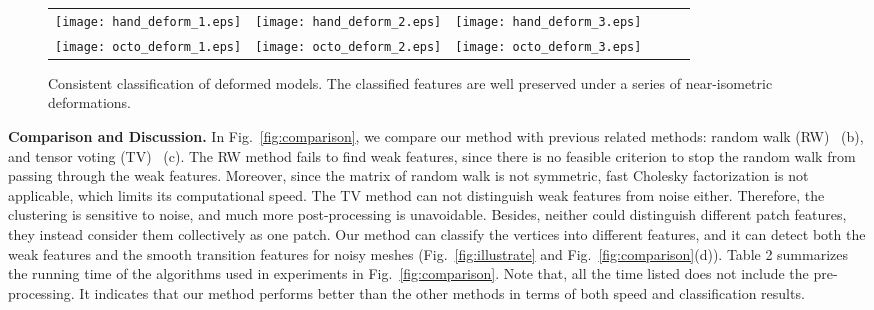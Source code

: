 \documentclass[10pt,journal,cspaper,compsoc]{IEEEtran}
\begin{document}
\begin{figure*}
\begin{center}
    \begin{tabular}{@{}c@{} @{}c@{} @{}c@{} @{}c@{} @{}c@{} @{}c@{}}
           \texttt{[image: hand\_deform\_1.eps]}&
           \texttt{[image: hand\_deform\_2.eps]}&
        \texttt{[image: hand\_deform\_3.eps]}\\
       \texttt{[image: octo\_deform\_1.eps]}&
        \texttt{[image: octo\_deform\_2.eps]}&
        \texttt{[image: octo\_deform\_3.eps]}\\
    \end{tabular}
    \caption{Consistent classification of deformed models.
The classified features are well preserved under a series of
near-isometric deformations.}
    \label{fig:Deformed}
\end{center}
\end{figure*}

\textbf{Comparison and Discussion.}
In Fig.~\ref{fig:comparison}, we compare our method with previous
related methods: random walk (RW)~\cite{LHMR09} (b), and tensor voting
(TV)~\cite{KCL09} (c). The RW method fails to find weak features,
since there is no feasible criterion to stop the random walk from
passing through the weak features. Moreover, since the matrix of
random walk is not symmetric, fast Cholesky factorization is not
applicable, which limits its computational speed. The TV method can
not distinguish weak features from noise either. Therefore, the
clustering is sensitive to noise, and much more post-processing is
unavoidable. Besides, neither could distinguish different patch
features, they instead consider them collectively as one patch. Our
method can classify the vertices into different features, and it can
detect both the weak features and the smooth transition features for
noisy meshes (Fig.~\ref{fig:illustrate} and
Fig.~\ref{fig:comparison}(d)). Table 2 summarizes the running time of
the algorithms used in experiments in Fig.~\ref{fig:comparison}. Note
that, all the time listed does not include the pre-processing. It
indicates that our method performs better than the other methods in
terms of both speed and classification results.
\end{document}
